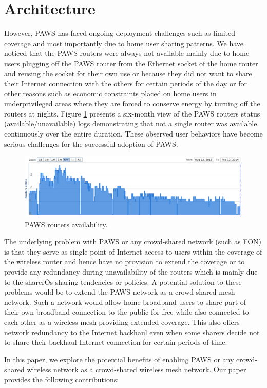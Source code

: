 \section{Architecture}
\label{sec:architecture}

However, PAWS has faced ongoing deployment challenges such as limited coverage and most importantly due to home user sharing patterns. We have noticed that the PAWS routers were always not available mainly due to home users plugging off the PAWS router from the Ethernet socket of the home router and reusing the socket for their own use or because they did not want to share their Internet connection with the others for certain periods of the day or for other reasons such as economic constraints placed on home users in underprivileged areas where they are forced to conserve energy by turning off the routers at nights. Figure \ref{fig:paws-avail} presents a six-month view of the PAWS routers status (available/unavailable) logs demonstrating that not a single router was available continuously over the entire duration. These observed user behaviors have become serious challenges for the successful adoption of PAWS. 

\begin{figure}[h]
\begin{center}
\includegraphics[width=1\linewidth]{paws-avail.pdf}  
\caption{PAWS routers availability.}
\label{fig:paws-avail}
\end{center}
\end{figure}

The underlying problem with PAWS or any crowd-shared network (such as FON) is that they serve as single point of Internet access to users within the coverage of the wireless router and hence have no provision to extend the coverage or to provide any redundancy during unavailability of the routers which is mainly due to the sharerÕs sharing tendencies or policies. A potential solution to these problems would be to extend the PAWS network as a crowd-shared mesh network. Such a network would allow home broadband users to share part of their own broadband connection to the public for free while also connected to each other as a wireless mesh providing extended coverage. This also offers network redundancy to the Internet backhaul even when some sharers decide not to share their backhaul Internet connection for certain periods of time. 

In this paper, we explore the potential benefits of enabling PAWS or any crowd-shared wireless network as a crowd-shared wireless mesh network. Our paper provides the following contributions:

